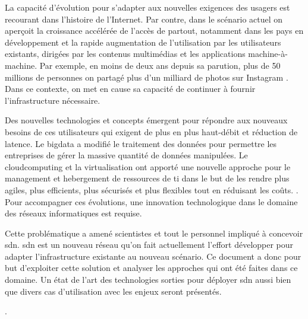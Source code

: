 \par
La capacité d'évolution pour s'adapter aux nouvelles exigences des usagers est recourant dans l'histoire de l'Internet. \cite{InternetSustainGrowth}
Par contre, dans le scénario actuel on aperçoit la croissance accélérée de l'accès de partout, notamment dans les pays en développement et la rapide augmentation de l'utilisation par les utilisateurs existants, dirigées par les contenus multimédias et les applications machine-à-machine. Par exemple, en moins de deux ans depuis sa parution, plus de 50 millions de personnes on partagé plus d'un milliard de photos sur Instagram \cite{deuxAnsInstagram}.
Dans ce contexte, on met en cause sa capacité de continuer à fournir l'infrastructure nécessaire.
\par
Des nouvelles technologies et concepts émergent pour répondre aux nouveaux besoins de ces utilisateurs qui exigent de plus en plus haut-débit et réduction de latence. Le \gls{bigdata} a modifié le traitement des données pour permettre les entreprises de gérer la massive quantité de données manipulées. \cite{IMBigData} Le \gls{cloudcomputing} et la \gls{virtualisation} ont apporté une nouvelle approche pour le management et hebergement de ressources de \gls{ti} dans le but de les rendre plus agiles, plus efficients, plus sécurisés et plus flexibles tout en réduisant les coûts. \cite{CloudComputingIntelVision}. Pour accompagner ces évolutions, une innovation technologique dans le domaine des réseaux informatiques est requise. \cite{InternetEvolutionRoleSoftwareEngineering}
\par
Cette problématique a amené scientistes et tout le personnel impliqué à concevoir \gls{sdn}. \gls{sdn} est un nouveau  réseau qu'on fait actuellement l'effort développer pour adapter l'infrastructure existante au nouveau scénario.\cite{OpenFlowStanford} Ce document a donc pour but d'exploiter cette solution et analyser les approches qui ont été faites dans ce domaine. Un état de l'art des technologies sorties pour déployer \gls{sdn} aussi bien que divers cas d'utilisation avec les enjeux seront présentés.
\par
[un paragraphe pour le plan du texte (de quoi parle chaque section)]
\par
[Un paragraphe pour conclure l'intro et laisser les pistes de mon point de vue et les conclusions trouvées].


